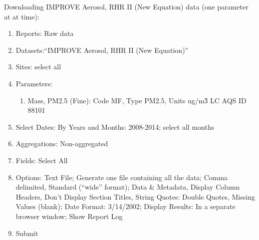 \noindent Downloading IMPROVE Aerosol, RHR II (New Equation) data (one parameter at at time):
\begin{enumerate}
\item Reports: Raw data
\item Datasets:``IMPROVE Aerosol, RHR II (New Equation)''
\item Sites: select all
\item Parameters: 
  \begin{enumerate}
  \item Mass, PM2.5 (Fine): Code MF, Type PM2.5, Units ug/m\^3 LC AQS ID 88101
  \end{enumerate}
\item Select Dates: By Years and Months: 2008-2014; select all months
\item Aggregations: Non-aggregated
\item Fields: Select All
\item Options: Text File; Generate one file containing all the data; Comma delimited, Standard (``wide'' format); Data \& Metadata, Display Column Headers, Don't Display Section Titles, String Quotes: Double Quotes, Missing Values (blank); Date Format: 3/14/2002; Display Results: In a separate browser window; Show Report Log
\item Submit
\end{enumerate}

